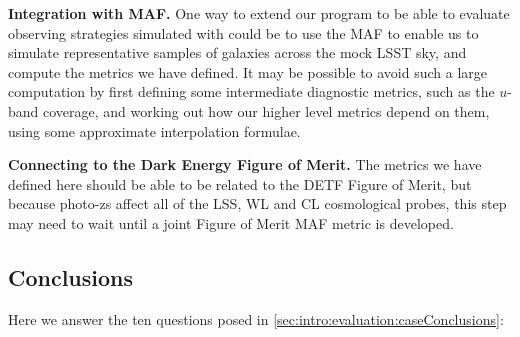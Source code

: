 \textbf{Integration with MAF.} One way to extend our program to be able
to evaluate observing strategies simulated with \OpSim could be to use
the MAF to enable us to simulate representative samples of galaxies
across the mock LSST sky, and compute the metrics we have defined.
It may be possible to avoid such a large computation by first defining
some intermediate diagnostic metrics, such as the $u$-band coverage, and
working out how our higher level metrics depend on them, using some
approximate interpolation formulae.

\textbf{Connecting to the Dark Energy Figure of Merit.} The metrics we
have defined here should be able to be related to the DETF Figure of
Merit, but because photo-zs affect all of the LSS, WL and CL
cosmological probes, this step may need to wait until a joint
Figure of Merit MAF metric is developed.

%
 \subsection{Conclusions}

 Here we answer the ten questions posed in
 \autoref{sec:intro:evaluation:caseConclusions}:

